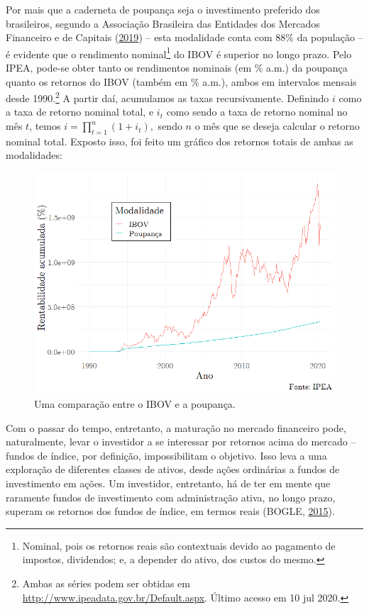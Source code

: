 \documentclass[grad,numbers]{coppe}
\begin{document}
  Por mais que a caderneta de poupança seja o investimento preferido dos brasileiros, segundo a Associação Brasileira das Entidades dos Mercados Financeiro e de Capitais (\protect\hyperlink{ref-anbima2019}{2019}) -- esta modalidade conta com 88\% da população -- é evidente que o rendimento nominal\footnote{Nominal, pois os retornos reais são contextuais devido ao pagamento de impostos, dividendos; e, a depender do ativo, dos custos do mesmo.} do IBOV é superior no longo prazo. Pelo IPEA, pode-se obter tanto os rendimentos nominais (em \% a.m.) da poupança quanto os retornos do IBOV (também em \% a.m.), ambos em intervalos mensais desde 1990.\footnote{Ambas as séries podem ser obtidas em \url{http://www.ipeadata.gov.br/Default.aspx}. Último acesso em 10 jul 2020.} A partir daí, acumulamos as taxas recursivamente. Definindo \(i\) como a taxa de retorno nominal total, e \(i_t\) como sendo a taxa de retorno nominal no mês \(t\), temos \(i = \prod_{t=1}^n (1+i_t),\) sendo \(n\) o mês que se deseja calcular o retorno nominal total. Exposto isso, foi feito um gráfico dos retornos totais de ambas as modalidades:
  \begin{figure}[H]
  \includegraphics[width=1\linewidth]{img/ibov-poupanca} \caption{Uma comparação entre o IBOV e a poupança.}\label{fig:unnamed-chunk-1}
  \end{figure}
  Com o passar do tempo, entretanto, a maturação no mercado financeiro pode, naturalmente, levar o investidor a se interessar por retornos acima do mercado -- fundos de índice, por definição, impossibilitam o objetivo. Isso leva a uma exploração de diferentes classes de ativos, desde ações ordinárias a fundos de investimento em ações. Um investidor, entretanto, há de ter em mente que raramente fundos de investimento com administração ativa, no longo prazo, superam os retornos dos fundos de índice, em termos reais (BOGLE, \protect\hyperlink{ref-bogle2015}{2015}).
\end{document}
